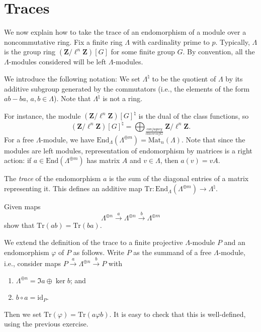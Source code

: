 \section{Traces}
\label{section-traces}

\noindent
We now explain how to take the trace of an endomorphism of a module over a
noncommutative ring. Fix a finite ring $\Lambda$ with cardinality prime to $p$.
Typically, $\Lambda$ is the group ring $(\mathbf{Z}/\ell^n\mathbf{Z})[G]$ for
some finite group $G$. By convention, all the $\Lambda$-modules considered will
be left $\Lambda$-modules.

\medskip\noindent
We introduce the following notation:
We set $\Lambda^\natural$ to be the quotient of $\Lambda$ by its additive
subgroup generated by the commutators (i.e., the elements of the form
$ab-ba$, $a, b \in \Lambda$). Note that $\Lambda^\natural$ is not a ring.

\medskip\noindent
For instance, the module $(\mathbf{Z}/\ell^n\mathbf{Z})[G]^\natural$ is the
dual of the class functions, so
$$
(\mathbf{Z}/\ell^n\mathbf{Z})[G]^\natural
=
\bigoplus_{\frac{conjugacy }{classes of G}}
\mathbf{Z}/\ell^n\mathbf{Z}.
$$
For a free $\Lambda$-module, we have $\text{End}_\Lambda(\Lambda^{\oplus m}) =
\text{Mat}_n(\Lambda)$. Note that since the modules are left modules,
representation of endomorphism by matrices is a right action: if $a \in
\text{End}(\Lambda^{\oplus m})$ has matrix $A$ and $v \in \Lambda$, then $a(v)
= v A$.

\begin{definition}
\label{definition-trace}
The {\it trace} of the endomorphism $a$ is the sum of the diagonal entries of
a matrix representing it. This defines an additive map $\text{Tr} :
\text{End}_\Lambda(\Lambda^{\oplus m}) \to \Lambda^\natural$.
\end{definition}

\begin{exercise}
\label{exercise-trace-is-trace}
Given maps
$$
\Lambda^{\oplus n} \xrightarrow{a}
\Lambda^{\oplus n} \xrightarrow{b}
\Lambda^{\oplus m}
$$
show that $\text{Tr}(ab) = \text{Tr}(ba)$.
\end{exercise}

\noindent
We extend the definition of the trace to a finite projective $\Lambda$-module
$P$ and an endomorphism $\varphi$ of $P$ as follows. Write $P$ as the summand
of a free $\Lambda$-module, i.e., consider maps $P \xrightarrow{a}
\Lambda^{\oplus n} \xrightarrow{b} P$ with
\begin{enumerate}
\item
$\Lambda^{\oplus n} = \Im a \oplus \ker b$; and
\item
$b\circ a = \text{id}_P$.
\end{enumerate}
Then we set $\text{Tr}(\varphi) = \text{Tr}(a\varphi b)$. It is easy to check
that this is well-defined, using the previous exercise.








